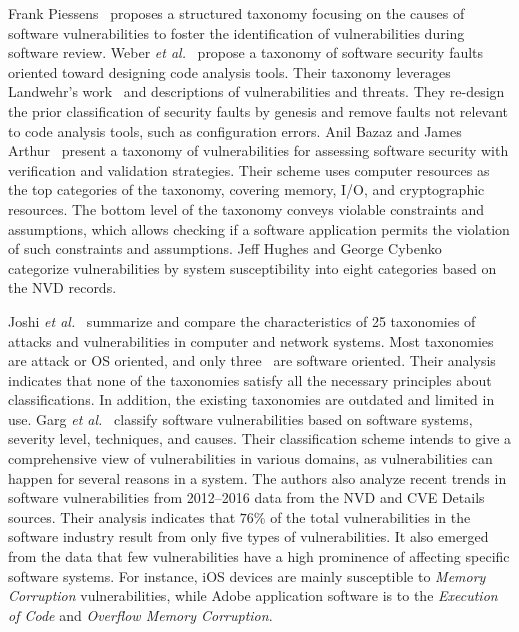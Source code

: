 \par
Frank Piessens~\cite{Piessens2002ATO} proposes a structured taxonomy focusing on the causes of software vulnerabilities to foster the identification of vulnerabilities during software review. Weber \textit{et al.}~\cite{Weber2005ASF} propose a taxonomy of software security faults oriented toward designing code analysis tools. Their taxonomy leverages Landwehr’s work~\cite{taxonomy_security_flaws} and descriptions of vulnerabilities and threats. They re-design the prior classification of security faults by genesis and remove faults not relevant to code analysis tools, such as configuration errors. Anil Bazaz and James Arthur~\cite{Bazaz2007TowardsAT} present a taxonomy of vulnerabilities for assessing software security with verification and validation strategies. Their scheme uses computer resources as the top categories of the taxonomy, covering memory, I/O, and cryptographic resources. The bottom level of the taxonomy conveys violable constraints and assumptions, which allows checking if a software application permits the violation of such constraints and assumptions. Jeff Hughes and George Cybenko~\cite{Hughes2013QuantitativeMA} categorize vulnerabilities by system susceptibility into eight categories based on the NVD records. 
\par
Joshi \textit{et al.}~\cite{Joshi2015ARO} summarize and compare the characteristics of 25 taxonomies of attacks and vulnerabilities in computer and network systems. Most taxonomies are attack or OS oriented, and only three~\cite{Bazaz2007TowardsAT, Piessens2002ATO, Weber2005ASF} are software oriented. Their analysis indicates that none of the taxonomies satisfy all the necessary principles about classifications. In addition, the existing taxonomies are outdated and limited in use. Garg \textit{et al.}~\cite{Garg2019AnalysisOS} classify software vulnerabilities based on software systems, severity level, techniques, and causes. Their classification scheme intends to give a comprehensive view of vulnerabilities in various domains, as vulnerabilities can happen for several reasons in a system. The authors also analyze recent trends in software vulnerabilities from 2012–2016 data from the NVD and CVE Details sources. Their analysis indicates that $76\%$ of the total vulnerabilities in the software industry result from only five types of vulnerabilities. It also emerged from the data that few vulnerabilities have a high prominence of affecting specific software systems. For instance, iOS devices are mainly susceptible to \textit{Memory Corruption} vulnerabilities, while Adobe application software is to the \textit{Execution of Code} and \textit{Overflow Memory Corruption}.
